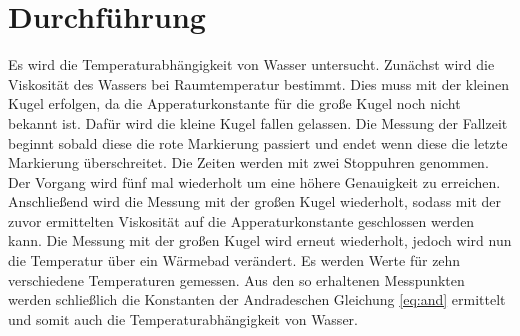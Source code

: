 \section{Durchführung}
\label{sec:Durchführung}
Es wird die Temperaturabhängigkeit von Wasser untersucht.
Zunächst wird die Viskosität des Wassers bei Raumtemperatur bestimmt. Dies muss mit der kleinen Kugel erfolgen,
da die Apperaturkonstante für die große Kugel noch nicht bekannt ist. Dafür wird die kleine Kugel fallen gelassen.
Die Messung der Fallzeit beginnt sobald diese die rote Markierung passiert und endet wenn diese die letzte Markierung überschreitet.
Die Zeiten werden mit zwei Stoppuhren genommen.
Der Vorgang wird fünf mal wiederholt um eine höhere Genauigkeit zu erreichen.
Anschließend wird die Messung mit der großen Kugel
wiederholt, sodass mit der zuvor ermittelten Viskosität auf die Apperaturkonstante geschlossen werden kann.
Die Messung mit der großen Kugel wird erneut wiederholt, jedoch wird nun die Temperatur über ein Wärmebad verändert.
Es werden Werte für zehn verschiedene Temperaturen gemessen.
Aus den so erhaltenen Messpunkten werden schließlich die Konstanten der Andradeschen Gleichung \eqref{eq:and} ermittelt
und somit auch die Temperaturabhängigkeit von Wasser.
